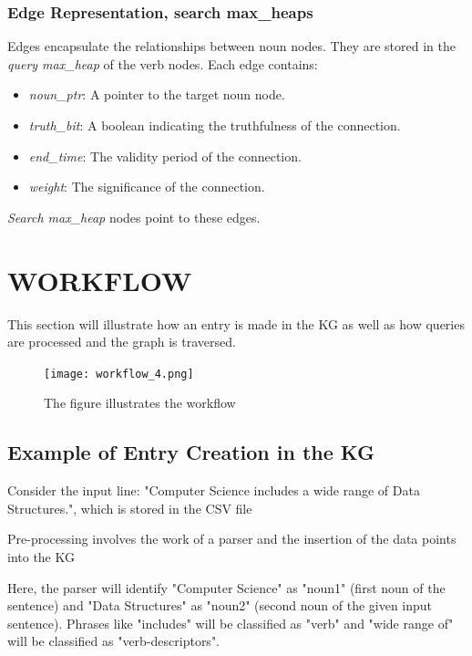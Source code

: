 \documentclass[conference]{IEEEtran}
\begin{document}
\subsubsection{\textbf{Edge Representation, search max\_heaps}}
Edges encapsulate the relationships between noun nodes. They are stored in the \textit{query max\_heap} of the verb nodes. Each edge contains:
\begin{itemize}

    \item \textit{noun\_ptr}: A pointer to the target noun node.
    \item \textit{truth\_bit}: A boolean indicating the truthfulness of the connection.
    \item \textit{end\_time}: The validity period of the connection.
    \item \textit{weight}: The significance of the connection.
\end{itemize}

\textit{Search max\_heap} nodes point to these edges.


\section{WORKFLOW}


This section will illustrate how an entry is made in the KG as well as how queries are processed and the graph is traversed.

\begin{figure}[htbp]
\centerline{\texttt{[image: workflow\_4.png]}}
\caption{The figure illustrates the workflow}
\label{fig}
\end{figure}
\subsection{\textbf{Example of Entry Creation in the KG}}

Consider the input line: "Computer Science includes a wide range of Data Structures.", which is stored in the CSV file

Pre-processing involves the work of a parser and the insertion of the data points into the KG

Here, the parser will identify "Computer Science" as "noun1" (first noun of the sentence)
and "Data Structures" as "noun2" (second noun of the given input sentence).
Phrases like "includes" will be classified as "verb" and "wide range of" will be classified as "verb-descriptors".
\end{document}
